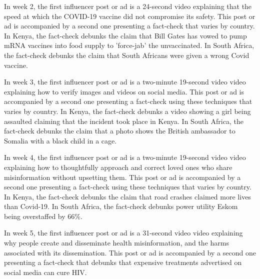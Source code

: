 In week 2, the first influencer post or ad is a 24-second video explaining that the speed at which the COVID-19 vaccine did not compromise its safety. %
This post or ad is accompanied by a second one presenting a fact-check that varies by country. In Kenya, the fact-check debunks the claim that Bill Gates has vowed to pump mRNA vaccines into food supply to 'force-jab' the unvaccinated. In South Africa, the fact-check debunks the claim that South Africans were given a wrong Covid vaccine.

In week 3, the first influencer post or ad is a two-minute 19-second video video explaining how to verify images and videos on social media. %
This post or ad is accompanied by a second one presenting a fact-check using these techniques that varies by country. In Kenya, the fact-check debunks a video showing a girl being assaulted claiming that the incident took place in Kenya. In South Africa, the fact-check debunks the claim that a photo shows the British ambassador to Somalia with a black child in a cage. 

In week 4, the first influencer post or ad is a two-minute 19-second video video explaining how to thoughtfully approach and correct loved ones who share misinformation without upsetting them. %
This post or ad is accompanied by a second one presenting a fact-check using these techniques that varies by country. In Kenya, the fact-check debunks the claim that road crashes claimed more lives than Covid-19. In South Africa, the fact-check debunks power utility Eskom being overstaffed by 66\%.

In week 5, the first influencer post or ad is a 31-second video video explaining why people create and disseminate health misinformation, and the harms associated with its dissemination.  
This post or ad is accompanied by a second one presenting a fact-check that debunks that expensive treatments advertised on social media can cure HIV.

